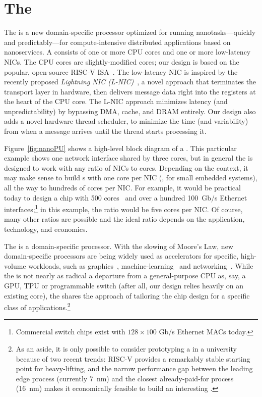 \section{The \name{}}
\label{sec:nanoPU}
The \name{} is a new domain-specific processor optimized for running nanotasks---quickly and predictably---for compute-intensive distributed applications based on nanoservices. 
A \name{} consists of one or more CPU cores and one or more low-latency NICs. 
The CPU cores are slightly-modified cores; our design is based on the popular, open-source RISC-V ISA~\cite{riscv}. 
The low-latency NIC is inspired by the recently proposed {\em Lightning NIC (L-NIC)}~\cite{lnic}, a novel approach that terminates the transport layer in hardware, then delivers message data right into the registers at the heart of the CPU core.  
The L-NIC approach minimizes latency (and unpredictability) by bypassing DMA, cache, and DRAM entirely. 
Our \name{} design also adds a novel hardware thread scheduler, to minimize the time (and variability) from when a message arrives until the thread starts processing it.

Figure~\ref{fig:nanoPU} shows a high-level block diagram of a \name{}. 
This particular example shows one network interface shared by three cores, but in general the \name{} is designed to work with any ratio of NICs to cores. 
Depending on the context, it may make sense to build \name{}s with one core per NIC (\eg, for small embedded systems), all the way to hundreds of cores per NIC. 
For example, it would be practical today to design a chip with 500 cores~\cite{celerity, kilocore} and over a hundred \SI{100}{Gb/s} Ethernet interfaces;\footnote{Commercial switch chips exist with $128\times 100$ Gb/s Ethernet MACs today.} in this example, the ratio would be five cores per NIC. 
Of course, many other ratios are possible and the ideal ratio depends on the application, technology, and economics. 

The \name{} is a domain-specific processor. 
With the slowing of Moore's Law, new domain-specific processors are being widely used as accelerators for specific, high-volume workloads, such as graphics~\cite{nvidia-geforce}, machine-learning~\cite{tensorflow} and networking~\cite{RMT}. 
While the \name{} is not nearly as radical a departure from a general-purpose CPU as, say, a GPU, TPU or programmable switch (after all, our design relies heavily on an existing core), the \name{} shares the approach of tailoring the chip design for a specific class of applications.\footnote{As an aside, it is only possible to consider prototyping a \name{} in a university because of two recent trends: RISC-V provides a remarkably stable starting point for heavy-lifting, and the narrow performance gap between the leading edge process (currently \SI{7}{nm}) and the closest already-paid-for process (\SI{16}{nm}) makes it economically feasible to build an interesting \name{}.}


